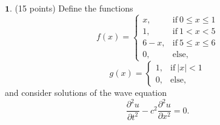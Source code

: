 \documentclass[12pt]{article}
\begin{document}
\noindent $\textbf{1}$. (15 points) Define the functions
$$f(x) =
\begin{cases}
	x, & \mathrm{if} \ 0 \leq x \leq 1 \\ 
	1, & \mathrm{if} \ 1 < x < 5 \\ 
	6-x, & \mathrm{if} \ 5 \leq x \leq 6 \\ 
	0, & \mathrm{else},
\end{cases}$$
$$g(x) =
\begin{cases}
	1, & \mathrm{if} \ |x| < 1 \\ 
	0, & \mathrm{else},
\end{cases}$$
and consider solutions of the wave equation
\begin{equation}
\label{WE}
\tag{WE}
 \frac{\partial^2 u}{\partial t^2} -c^2 \frac{\partial^2 u}{\partial x^2} = 0.
\end{equation}
\end{document}
